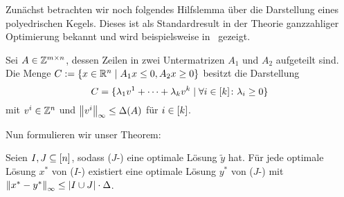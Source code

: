 Zunächst betrachten wir noch folgendes Hilfslemma über die Darstellung eines polyedrischen Kegels.
Dieses ist als Standardresult in der Theorie ganzzahliger Optimierung bekannt und wird beispielsweise in~\cite{Korte2012} gezeigt.
\begin{lemma}\label{lem:cone}
	Sei $A\in\mathbb{Z}^{m\times n}$, dessen Zeilen in zwei Untermatrizen $A_1$ und $A_2$ aufgeteilt sind.
	Die Menge $C:=\{ x\in\mathbb{R}^n \mid A_1x\leq 0, A_2x\geq0 \}$ besitzt die Darstellung \[ C=\{\lambda_1 v^1+\dots+\lambda_kv^k \mid \forall i\in[k] \colon\lambda_i\geq0 \}\] mit $v^i\in\mathbb{Z}^n$ und $\left\lVert v^i\right\rVert_\infty\leq\Delta(A)$ für $i\in[k]$.
\end{lemma}

Nun formulieren wir unser Theorem:

\begin{theorem}\label{thm:theo2}
	Seien $I,J\subseteq[n]$, sodass ($J$-\MIPR) eine optimale Lösung $\tilde{y}$ hat.
	Für jede optimale Lösung $x^*$ von ($I$-\MIPR) existiert eine optimale Lösung $y^*$ von ($J$-\MIPR) mit $\left\lVert x^*-y^*\right\rVert_\infty\leq\lvert I\cup J \rvert\cdot\Delta$.
\end{theorem}
